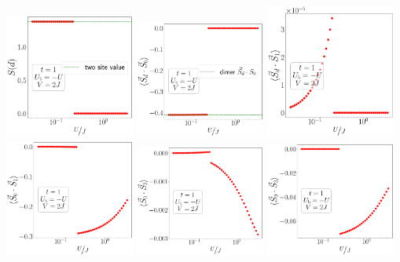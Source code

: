 \documentclass{report}
\numberwithin{equation}{section}
\begin{document}
\begin{center}
	\includegraphics[width=0.32\textwidth]{../figures/EE-d-t=1.000,J=31.623,0.000,50,V=2J,Ubath=-U,N=4,U=0.032,3.162,50.pdf}
	\includegraphics[width=0.32\textwidth]{../figures/corr-d0-t=1.000,J=31.623,0.000,50,V=2J,Ubath=-U,N=4,U=0.032,3.162,50.pdf}
	\includegraphics[width=0.32\textwidth]{../figures/corr-d1-t=1.000,J=31.623,0.000,50,V=2J,Ubath=-U,N=4,U=0.032,3.162,50.pdf}
	\includegraphics[width=0.32\textwidth]{../figures/r-vec-corr-01-t=1.000,J=31.623,0.000,50,V=2J,Ubath=-U,N=4,U=0.032,3.162,50.pdf}
	\includegraphics[width=0.32\textwidth]{../figures/r-vec-corr-02-t=1.000,J=31.623,0.000,50,V=2J,Ubath=-U,N=4,U=0.032,3.162,50.pdf}
	\includegraphics[width=0.32\textwidth]{../figures/r-vec-corr-03-t=1.000,J=31.623,0.000,50,V=2J,Ubath=-U,N=4,U=0.032,3.162,50.pdf}


\end{center}
\end{document}
